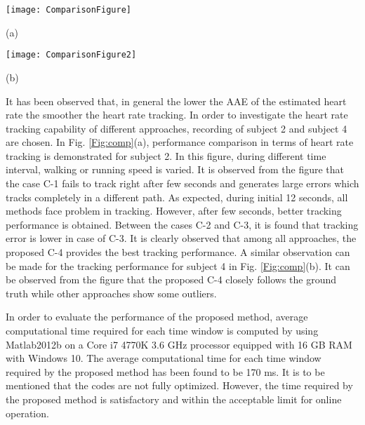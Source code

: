 \documentclass[final,3p,times,authoryear]{elsarticle}
\begin{document}
\begin{figure*}[h]
  \begin{minipage}[b]{0.48\linewidth}
 	 \centering
  	\centerline{\texttt{[image: ComparisonFigure]}}
  	\centerline{\footnotesize{(a)}}\medskip
  \end{minipage}
  \begin{minipage}[b]{0.48\linewidth}
 	 \centering
  	\centerline{\texttt{[image: ComparisonFigure2]}}
  	\centerline{\footnotesize{(b)}}\medskip
  \end{minipage}
  
  \caption{Performance comparison in terms of heart rate tracking on (a) subject 2 and (b) subject 4.}\label{Fig:comp}
\end{figure*}

It has been observed that, in general the lower the AAE of the estimated heart rate the smoother the heart rate tracking. In order to investigate the heart rate tracking capability of different approaches, recording of subject 2 and subject 4 are chosen. In Fig. {\ref{Fig:comp}}(a), performance comparison in terms of heart rate tracking is demonstrated for subject 2. In this figure, during different time interval, walking or running speed is varied. It is observed from the figure that the case C-1 fails to track right after few seconds and generates large errors which tracks completely in a different path. As expected, during initial 12 seconds, all methods face problem in tracking. However, after few seconds, better tracking performance is obtained. Between the cases C-2 and C-3, it is found that tracking error is lower in case of C-3. It is clearly observed that among all approaches, the proposed C-4 provides the best tracking performance. A similar observation can be made for the tracking performance for subject 4 in Fig. {\ref{Fig:comp}}(b). It can be observed from the figure that the proposed C-4 closely follows the ground truth while other approaches show some outliers.


In order to evaluate the performance of the proposed method, average computational time required for each time window is computed by using Matlab2012b on a Core i7 4770K 3.6 GHz processor equipped with 16 GB RAM with Windows 10. The average computational time for each time window required by the proposed method has been found to be 170 ms. It is to be mentioned that the codes are not fully optimized. However, the time required by the proposed method is satisfactory and within the acceptable limit for online operation.
\end{document}

